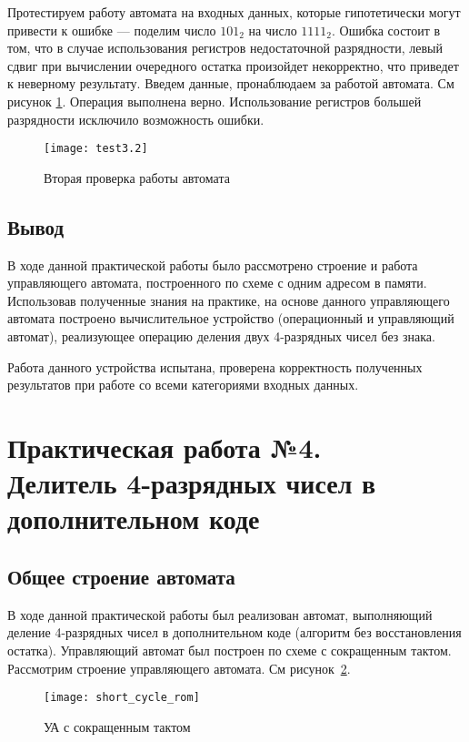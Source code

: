 \documentclass[a4paper,14pt]{extarticle}
\begin{document}
Протестируем работу автомата на входных данных, которые гипотетически могут привести к ошибке --- поделим число $101_2$ на число $1111_2$. Ошибка состоит в том, что в случае использования регистров недостаточной разрядности, левый сдвиг при вычислении очередного остатка произойдет некорректно, что приведет к неверному результату. Введем данные, пронаблюдаем за работой автомата. См рисунок \ref{img:test3.2}. Операция выполнена верно. Использование регистров большей разрядности исключило возможность ошибки.
\begin{figure}[h!]
	\centering
	\texttt{[image: test3.2]}
	\caption {Вторая проверка работы автомата}
	\label{img:test3.2}
\end{figure}
\subsection {Вывод}
В ходе данной практической работы было рассмотрено строение и работа управляющего автомата, построенного по схеме с одним адресом в памяти. Использовав полученные знания на практике, на основе данного управляющего автомата построено вычислительное устройство (операционный и управляющий автомат), реализующее операцию деления двух 4-разрядных чисел без знака.

Работа данного устройства испытана, проверена корректность полученных результатов при работе со всеми категориями входных данных. 
\newpage
\section {Практическая работа №4.\\Делитель 4-разрядных чисел в дополнительном коде}
\subsection{Общее строение автомата}
В ходе данной практической работы был реализован автомат, выполняющий деление 4-разрядных чисел в дополнительном коде (алгоритм без восстановления остатка). Управляющий автомат был построен по схеме с сокращенным тактом. Рассмотрим строение управляющего автомата. См рисунок~\ref{img:scheme4}.

\begin{figure}[h!]
	\begin{center}
		\texttt{[image: short\_cycle\_rom]}
		\caption{УА с сокращенным тактом}
		\label{img:scheme4}
	\end{center}	
\end{figure}
\end{document}
